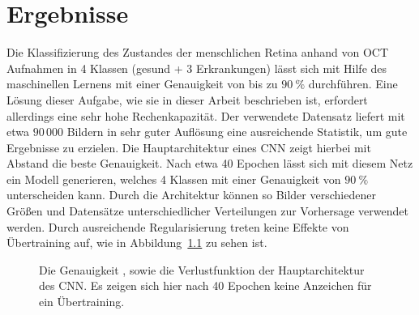 {\let\clearpage\relax \chapter{Ergebnisse}}

Die Klassifizierung des Zustandes der menschlichen Retina anhand von OCT
Aufnahmen in 4 Klassen (gesund + 3 Erkrankungen) lässt sich mit Hilfe des
maschinellen Lernens mit einer Genauigkeit von bis zu $\SI{90}{\percent}$
durchführen. Eine Lösung dieser Aufgabe, wie sie in dieser Arbeit beschrieben
ist, erfordert allerdings eine sehr hohe Rechenkapazität. Der verwendete
Datensatz liefert mit etwa $90\,000$ Bildern in sehr guter Auflösung eine
ausreichende Statistik, um gute Ergebnisse zu erzielen.
Die Hauptarchitektur eines CNN zeigt hierbei mit Abstand die beste
Genauigkeit. Nach etwa 40 Epochen lässt sich mit diesem Netz ein
Modell generieren, welches 4 Klassen mit einer Genauigkeit von
$\SI{90}{\percent}$ unterscheiden kann. Durch die Architektur können so Bilder
verschiedener Größen und Datensätze unterschiedlicher Verteilungen zur
Vorhersage verwendet werden. Durch ausreichende Regularisierung treten keine
Effekte von Übertraining auf, wie in Abbildung~\ref{fig:hist} zu sehen
ist.
%
\begin{figure}[h!]
  \renewcommand{\baselinestretch}{1.0}
  \caption{Die Genauigkeit \protect{}, sowie die Verlustfunktion \protect{} der Hauptarchitektur des CNN. Es zeigen sich hier nach 40 Epochen keine Anzeichen für ein Übertraining.}
  \renewcommand{\baselinestretch}{1.5}
  \label{fig:hist}
\end{figure}
